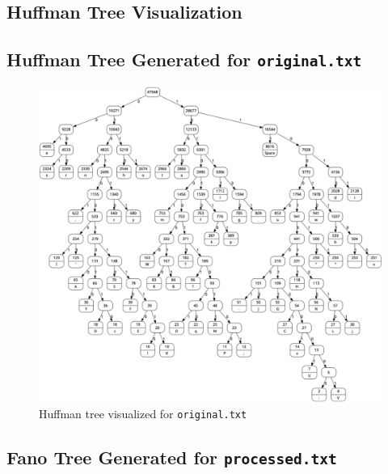 \documentclass[12pt,twoside]{article}
\begin{document}
\begin{appendices}

\newpage
\section{Huffman Tree Visualization}
\subsection{Huffman Tree Generated for \texttt{original.txt}}
\label{app:huffmanTree}

\begin{figure}[h!]
    \centering
    \hspace*{-1.3cm}
    \includegraphics[width=1.15\textwidth]{huffmanTree.png}
    \caption{Huffman tree visualized for \texttt{original.txt}}
    \label{fig:huffmanTree}
\end{figure}

\newpage
\subsection{Fano Tree Generated for \texttt{processed.txt}}
\label{app:huffmanTreeAME}


\end{appendices}
\end{document}
